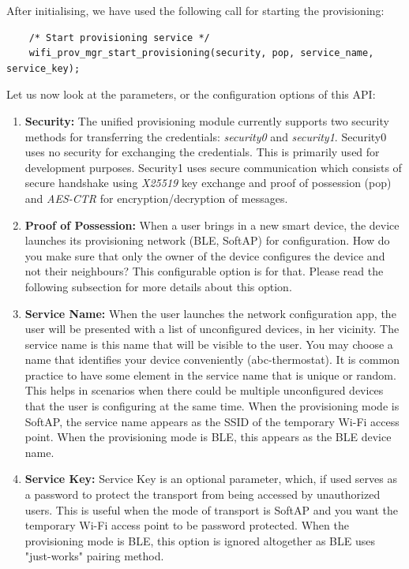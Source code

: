 \documentclass[main.tex]{subfiles}
\begin{document}
After initialising, we have used the following call for starting the provisioning:
\begin{verbatim}
    /* Start provisioning service */
    wifi_prov_mgr_start_provisioning(security, pop, service_name, service_key);
\end{verbatim}

Let us now look at the parameters, or the configuration options of this API:
\begin{enumerate}
    \item \textbf{Security:} The unified provisioning module currently supports two security methods for transferring the credentials: \textit{security0} and \textit{security1}. Security0 uses no security for exchanging the credentials. This is primarily used for development purposes. Security1 uses secure communication which consists of secure handshake using \textit{X25519} key exchange and proof of possession (pop) and \textit{AES-CTR} for encryption/decryption of messages.
    \item \textbf{Proof of Possession:} When a user brings in a new smart device, the device launches its provisioning network (BLE, SoftAP) for configuration.  How do you make sure that only the owner of the device configures the device and not their neighbours? This configurable option is for that. Please read the following subsection for more details about this option.
    \item \textbf{Service Name:} When the user launches the network configuration app, the user will be presented with a list of unconfigured devices, in her vicinity. The service name is this name that will be visible to the user. You may choose a name that identifies your device conveniently (abc-thermostat). It is common practice to have some element in the service name that is unique or random. This helps in scenarios when there could be multiple unconfigured devices that the user is configuring at the same time. When the provisioning mode is SoftAP, the service name appears as the SSID of the temporary Wi-Fi access point. When the provisioning mode is BLE, this appears as the BLE device name.
    \item \textbf{Service Key:} Service Key is an optional parameter, which, if used serves as a password to protect the transport from being accessed by unauthorized users. This is useful when the mode of transport is SoftAP and you want the temporary Wi-Fi access point to be password protected. When the provisioning mode is BLE, this option is ignored altogether as BLE uses "just-works" pairing method.
\end{enumerate}
\end{document}
